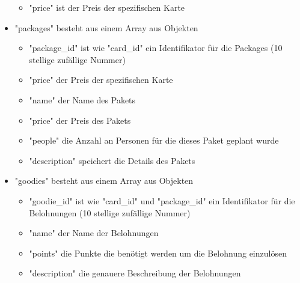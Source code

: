 \begin{itemize}
\begin{itemize}
						\item "price" ist der Preis der spezifischen Karte
					\end{itemize}
					\item "packages" besteht aus einem Array aus Objekten
					\begin{itemize}
						\item "package\_id" ist wie "card\_id" ein Identifikator für die Packages (10 stellige zufällige Nummer)
						\item "price" der Preis der spezifischen Karte
						\item "name" der Name des Pakets
						\item "price" der Preis des Pakets
						\item "people" die Anzahl an Personen für die dieses Paket geplant wurde
						\item "description" speichert die Details des Pakets
					\end{itemize}
					\item "goodies" besteht aus einem Array aus Objekten
					\begin{itemize}
						\item "goodie\_id" ist wie "card\_id" und "package\_id" ein Identifikator für die Belohnungen (10 stellige zufällige Nummer)
						\item "name" der Name der Belohnungen
						\item "points" die Punkte die benötigt werden um die Belohnung einzulösen
						\item "description" die genauere Beschreibung der Belohnungen
					\end{itemize}				
				\end{itemize}
		
			\newpage
			
